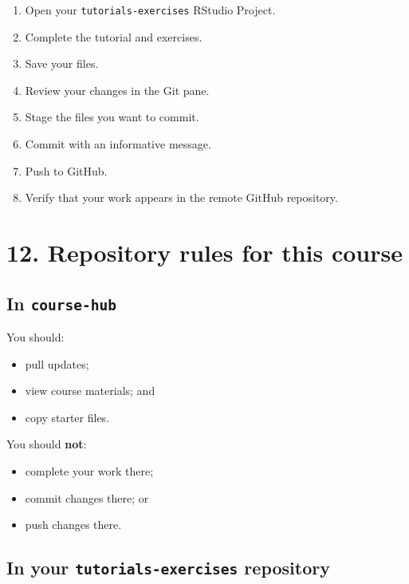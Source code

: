\documentclass[
  letterpaper,
  DIV=11,
  numbers=noendperiod]{scrartcl}
\providecommand{\tightlist}{%
  \setlength{\itemsep}{0pt}\setlength{\parskip}{0pt}}
\begin{document}
\begin{enumerate}
\def\labelenumi{\arabic{enumi}.}
\setcounter{enumi}{4}
\tightlist
\item
  Open your \texttt{tutorials-exercises} RStudio Project.
\item
  Complete the tutorial and exercises.
\item
  Save your files.
\item
  Review your changes in the Git pane.
\item
  Stage the files you want to commit.
\item
  Commit with an informative message.
\item
  Push to GitHub.
\item
  Verify that your work appears in the remote GitHub repository.
\end{enumerate}

\section{12. Repository rules for this
course}\label{repository-rules-for-this-course}

\subsection{\texorpdfstring{In
\texttt{course-hub}}{In course-hub}}\label{in-course-hub}

You should:

\begin{itemize}
\tightlist
\item
  pull updates;
\item
  view course materials; and
\item
  copy starter files.
\end{itemize}

You should \textbf{not}:

\begin{itemize}
\tightlist
\item
  complete your work there;
\item
  commit changes there; or
\item
  push changes there.
\end{itemize}

\subsection{\texorpdfstring{In your \texttt{tutorials-exercises}
repository}{In your tutorials-exercises repository}}\label{in-your-tutorials-exercises-repository}
\end{document}
